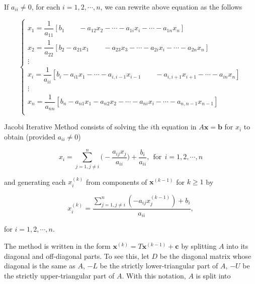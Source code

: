 \documentclass[preprint,12pt]{elsarticle}
\begin{document}
If $a_{ii}\ne 0$, for  each $i=1,2,\cdots,n$, we can rewrite above equation  as the follows

$$
\left \{%
\begin{array}{l}
x_1=\dfrac{1}{a_{11}}[b_1 \qquad-a_{12}x_2-\cdots-a_{1i}x_i-\cdots-a_{1n}x_n]\\[5pt]
x_2=\dfrac{1}{a_{22}}[b_2-a_{21}x_1 \qquad -a_{23}x_3-\cdots-a_{2i}x_i-\cdots-a_{2n}x_n]\\
\vdots \\
x_i=\dfrac{1}{a_{ii}}[b_i-a_{i1}x_1-\cdots-a_{i,i-1}x_{i-1} \qquad-a_{i,i+1}x_{i+1}-\cdots-a_{in}x_n]\\
\vdots \\
x_n=\dfrac{1}{a_{nn}}[b_n-a_{n1}x_1-a_{n2}x_2-\cdots-a_{ni}x_i-\cdots-a_{n,n-1}x_{n-1}]\\
\end{array}
\right.
$$

Jacobi Iterative Method consists of solving the $i$th equation in $A\mathbf{x} = \mathbf{b}$ for $x_i$ to obtain (provided $a_{ii}\ne 0$)

\[
x_i=\sum_{j=1,j\ne i}^n
\biggl(-\frac{a_{ij}x_j}{a_{ii}}\biggr)+\frac{b_i}{a_{ii}},\ \
\text{for} \ \ i=1,2,\cdots,n
\]

and generating each $x_i^{(k)}$ from components of $\mathbf{x}^{(k-1)}$ for $k\ge 1$ by

\begin{equation*}
x_i^{(k)}= \frac{\sum\limits_{j=1,j\ne
i}^n(-a_{ij}x_j^{(k-1)})+b_i}{a_{ii}},
\end{equation*}

for $i=1,2,\cdots,n.$ 

The method is written in the form $\mathbf{x}^{(k)} =T\mathbf{x}^{(k-1)} + \mathbf{c}$ by splitting $A$ into its diagonal and off-diagonal parts. To see this, let $D$ be the diagonal matrix whose diagonal is the same as $A$, $- L$ be the strictly lower-triangular part of $A$, $- U$ be the strictly upper-triangular part of $A$. With this notation, $A$ is split into
\end{document}
